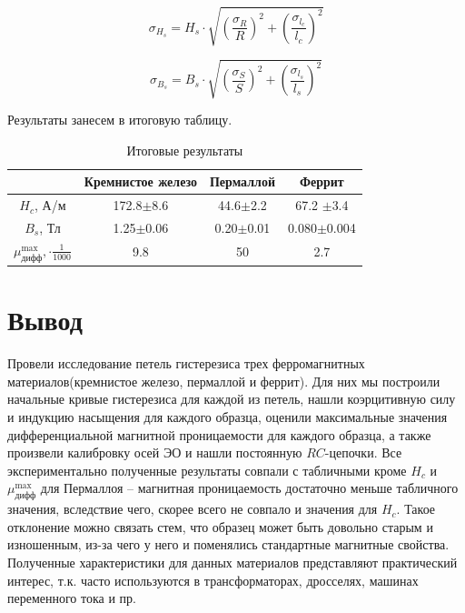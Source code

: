 \documentclass[a4paper,12pt]{article}
\begin{document}
\begin{equation}\label{}
\sigma_{H_s} = H_s\cdot\sqrt{(\frac{\sigma_R}{R})^2 + (\frac{\sigma_{l_c}}{l_c})^2}
\end{equation}


\begin{equation}\label{}
\sigma_{B_s} = B_s\cdot \sqrt{(\frac{\sigma_S}{S})^2 + (\frac{\sigma_{l_s}}{l_s})^2}
\end{equation}



Результаты занесем в итоговую таблицу. 

\begin{table}[h!]
	\centering
	\caption{Итоговые результаты}
    \begin{tabular}{|c|c|c|c|}
	\hline 
		& Кремнистое железо & Пермаллой & Феррит \\
		\hline 
		$H_c$, А/м & 172.8$\pm$8.6 & 44.6$\pm$2.2 & 67.2 $\pm$3.4\\
		\hline
		$B_s$, Тл &  1.25$\pm$0.06 & 0.20$\pm$0.01 & 0.080$\pm$0.004\\
		\hline
		$\mu_{\text{дифф}}^{\max}, \cdot \frac{1}{1000}$ & 9.8 & 50 & 2.7\\
        \hline
	    \end{tabular}%
	    
\label{resT}%
\end{table}%



\section{Вывод}
Провели исследование петель гистерезиса трех ферромагнитных материалов(кремнистое железо, пермаллой и феррит). Для них мы построили начальные кривые гистерезиса для каждой из петель, нашли коэрцитивную силу и индукцию насыщения для каждого образца, оценили максимальные значения дифференциальной магнитной проницаемости для каждого образца, а также произвели калибровку осей ЭО и нашли постоянную $RC$-цепочки. Все экспериментально полученные результаты совпали с табличными кроме $H_c$ и $\mu_{\text{дифф}}^{\max}$ для Пермаллоя -- магнитная проницаемость достаточно меньше  табличного значения, вследствие чего, скорее всего не совпало и значения для $H_c$. Такое отклонение можно связать стем, что образец может быть довольно старым и изношенным, из-за чего у него и поменялись стандартные магнитные свойства. Полученные характеристики для данных материалов представляют практический интерес, т.к. часто используются в трансформаторах, дросселях, машинах переменного тока и пр.
\end{document}
